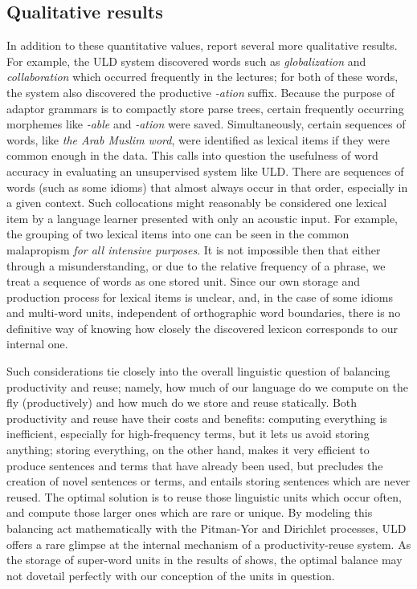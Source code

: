 \documentclass[12pt,letterpaper]{article}
\begin{document}
\subsection{Qualitative results}
In addition to these quantitative values, \citet{lee:2015} report several more qualitative results. For example, the ULD system discovered words such as \textit{globalization} and \textit{collaboration} which occurred frequently in the lectures; for both of these words, the system also discovered the productive \textit{-ation} suffix. Because the purpose of adaptor grammars is to compactly store parse trees, certain frequently occurring morphemes like \textit{-able} and \textit{-ation} were saved. Simultaneously, certain sequences of words, like \textit{the Arab Muslim word}, were identified as lexical items if they were common enough in the data. This calls into question the usefulness of word accuracy in evaluating an unsupervised system like ULD. There are sequences of words (such as some idioms) that almost always occur in that order, especially in a given context. Such collocations might reasonably be considered one lexical item by a language learner presented with only an acoustic input. For example, the grouping of two lexical items into one can be seen in the common malapropism \textit{for all intensive purposes}. It is not impossible then that either through a misunderstanding, or due to the relative frequency of a phrase, we treat a sequence of words as one stored unit. Since our own storage and production process for lexical items is unclear, and, in the case of some idioms and multi-word units, independent of orthographic word boundaries, there is no definitive way of knowing how closely the discovered lexicon corresponds to our internal one. 

Such considerations tie closely into the overall linguistic question of balancing productivity and reuse; namely, how much of our language do we compute on the fly (productively) and how much do we store and reuse statically. Both productivity and reuse have their costs and benefits: computing everything is inefficient, especially for high-frequency terms, but it lets us avoid storing anything; storing everything, on the other hand, makes it very efficient to produce sentences and terms that have already been used, but precludes the creation of novel sentences or terms, and entails storing sentences which are never reused. The optimal solution is to reuse those linguistic units which occur often, and compute those larger ones which are rare or unique. By modeling this balancing act mathematically with the Pitman-Yor and Dirichlet processes, ULD offers a rare glimpse at the internal mechanism of a productivity-reuse system. As the storage of super-word units in the results of \citet{lee:2015} shows, the optimal balance may not dovetail perfectly with our conception of the units in question. 
\end{document}
